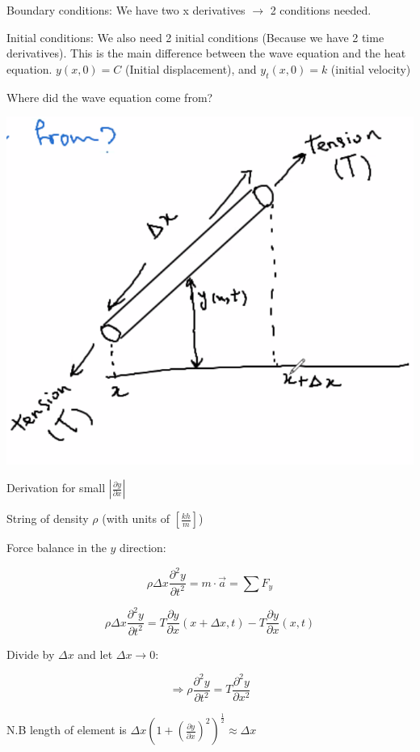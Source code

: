 Boundary conditions: We have two x derivatives $\to$ 2 conditions needed. 

Initial conditions: We also need 2 initial conditions (Because we have 2 time derivatives). This is the main difference between the wave equation and the heat equation.  $y(x,0) = C$ (Initial displacement), and $y_t(x,0) = k$ (initial velocity)

\hfill

Where did the wave equation come from?

\includegraphics[width = 0.9 \textwidth]{image1.png}

Derivation for small $\left| \frac{\partial y}{\partial x} \right|$

String of density $\rho$ (with units of $\left[ \frac{kh}{m} \right]$)

Force balance in the $y$ direction:

$$\rho \Delta x \frac{\partial^2 y}{\partial t^2} = m \cdot \vec{a} = \sum F_y$$


$$\rho \Delta x \frac{\partial^2 y}{\partial t^2} = T \frac{\partial y}{\partial x} \left( x + \Delta x, t \right) - T \frac{\partial y}{\partial x} (x,t)$$

Divide by $\Delta x$ and let $\Delta x \to 0$:

$$\Rightarrow \rho \frac{\partial^2 y}{\partial t^2} = T \frac{\partial^2 y}{\partial x^2}$$

N.B length of element is $\Delta x (1 + (\frac{\partial y}{\partial x})^2 )^{\frac{1}{2}} \approx \Delta x$

\hfill

